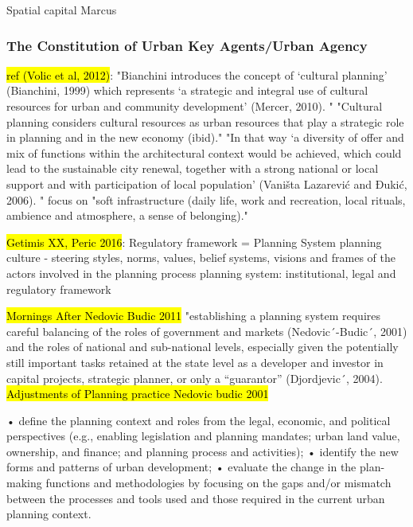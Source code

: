 \documentclass[11pt]{report}
\begin{document}
Spatial capital Marcus


\subsubsection{The Constitution of Urban Key Agents/Urban Agency}

\hl{ref (Volic et al, 2012)}:
"Bianchini introduces the concept of ‘cultural planning’ (Bianchini, 1999) which represents ‘a strategic and integral use of cultural  resources  for  urban  and  community development’ (Mercer, 2010). "
"Cultural  planning considers cultural resources as urban resources that play a strategic role in planning and in the
new economy (ibid)."
"In that way ‘a diversity of offer and mix of functions within the architectural context would be achieved, which could  lead  to  the  sustainable  city  renewal, together with a strong national or local support and  with  participation  of  local  population’ (Vaništa Lazarević and Đukić, 2006). "
focus on "soft infrastructure (daily  life, work and recreation, local rituals, ambience and atmosphere, a sense of belonging)."

\hl{Getimis XX, Peric 2016}:
Regulatory framework = Planning System
planning culture -  steering styles, norms, values, belief systems, visions and frames of the actors involved in the planning process
planning system: institutional, legal and regulatory framework

\hl{Mornings After Nedovic Budic 2011}
"establishing a planning system requires careful balancing of the roles of government and markets (Nedovic´-Budic´, 2001) and the roles of national and sub-national levels, especially given the potentially still important tasks retained at the state level as a developer and investor in capital projects, strategic planner, or only a “guarantor” (Djordjevic´, 2004).
\hl{Adjustments of Planning practice Nedovic budic 2001}

• deﬁne the planning context and roles from the legal, economic, and political perspectives (e.g., enabling legislation and planning mandates;
urban land value, ownership, and ﬁnance; and
planning process and activities);
• identify the new forms and patterns of urban development;
• evaluate the change in the plan-making functions and methodologies by focusing on the gaps and/or mismatch between the processes and tools used
and those required in the current urban planning context.
\end{document}

